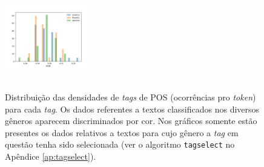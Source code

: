 \documentclass[10pt,a4paper,onecolumn]{article}
\theoremstyle{definition}
\theoremstyle{remark}
\begin{document}
\begin{figure}[htpb!]
\begin{multicols}{2}
	\hspace*{-1.75cm}
	\includegraphics[width=0.33\textwidth]{graficos/histograma_VERB.png} \\ \hspace*{-1.75cm}  \\
\end{multicols}
\caption{Distribuição das densidades de \emph{tags} de POS (ocorrências pro \emph{token}) para cada \emph{tag}. Os dados referentes a textos classificados nos diversos gêneros aparecem discriminados por cor. Nos gráficos somente estão presentes os dados relativos a textos para cujo gênero a \emph{tag} em questão tenha sido selecionada (ver o algoritmo \texttt{tagselect} no Apêndice \ref{ap:tagselect}).}
\label{fig:histogramas}
\end{figure}
\end{document}
